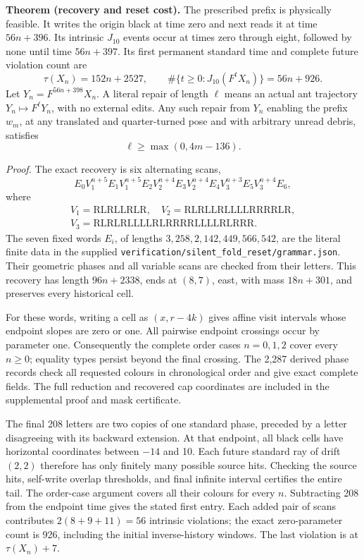 \textbf{Theorem (recovery and reset cost).}
The prescribed prefix is physically feasible. It writes the origin black
at time zero and next reads it at time \(56n+396\). Its intrinsic
\(J_{10}\) events occur at times zero through eight, followed by none
until time \(56n+397\). Its first permanent standard time and complete
future violation count are
\[
 \tau(X_n)=152n+2527,\qquad
 \#\{t\ge0:J_{10}(F^tX_n)\}=56n+926.
\]
Let \(Y_n=F^{56n+398}X_n\). A literal repair of length $\ell$ means an actual ant trajectory
$Y_n\mapsto F^\ell Y_n$, with no external edits. Any such repair from
\(Y_n\) enabling the prefix \(w_m\), at any translated and quarter-turned
pose and with arbitrary unread debris, satisfies
\[
 \ell\ge\max(0,4m-136).
\]

\textit{Proof.}
The exact recovery is six alternating scans,
\[
 E_0 V_1^{n+5}E_1V_1^{n+5}E_2
 V_2^{n+4}E_3V_2^{n+4}E_4V_3^{n+3}E_5V_3^{n+4}E_6,
\]
where
\[
\begin{gathered}
 V_1=\mathrm{RLRLLRLR},\quad
 V_2=\mathrm{RLRLLRLLLLRRRRLR},
\\
 V_3=\mathrm{RLRLRLLLLRLRRRRLLLLRLRRR}.
\end{gathered}
\]
The seven fixed words \(E_i\), of lengths
\(3,258,2,142,449,566,542\), are the literal finite data in the supplied
\texttt{verification/silent\_fold\_reset/grammar.json}. Their geometric phases and all
variable scans are checked from their letters. This recovery has length
\(96n+2338\), ends at \((8,7)\), east, with mass \(18n+301\), and preserves
every historical cell.

For these words, writing a cell as \((x,r-4k)\) gives affine visit intervals
whose endpoint slopes are zero or one. All pairwise endpoint crossings
occur by parameter one. Consequently the complete order cases \(n=0,1,2\)
cover every \(n\ge0\); equality types persist beyond the final crossing.
The 2,287 derived phase records check all requested colours in chronological
order and give exact complete fields. The full reduction and recovered
cap coordinates are included in the supplemental proof and mask certificate.

The final 208 letters are two copies of one standard phase, preceded by a
letter disagreeing with its backward extension. At that endpoint, all
black cells have horizontal coordinates between \(-14\) and 10. Each
future standard ray of drift \((2,2)\) therefore has only finitely many
possible source hits. Checking the source hits, self-write overlap thresholds,
and final infinite interval certifies the entire tail. The order-case
argument covers all their colours for every \(n\). Subtracting 208 from
the endpoint time gives the stated first entry. Each added pair of scans
contributes \(2(8+9+11)=56\) intrinsic violations; the exact zero-parameter
count is 926, including the initial inverse-history windows. The last
violation is at \(\tau(X_n)+7\).

